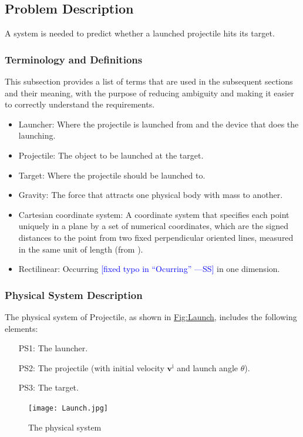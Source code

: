 \documentclass[12pt]{article}
\newcommand{\authornote}[3]{\textcolor{#1}{[#3 ---#2]}}
\newcommand{\authornote}[3]{}
\newcommand{\wss}[1]{\authornote{blue}{SS}{#1}}
\begin{document}
\subsection{Problem Description}
\label{Sec:ProbDesc}
A system is needed to predict whether a launched projectile hits its target.

\subsubsection{Terminology and Definitions}
\label{Sec:TermDefs}
This subsection provides a list of terms that are used in the subsequent sections and their meaning, with the purpose of reducing ambiguity and making it easier to correctly understand the requirements.

\begin{itemize}
\item{Launcher: Where the projectile is launched from and the device that does the launching.}
\item{Projectile: The object to be launched at the target.}
\item{Target: Where the projectile should be launched to.}
\item{Gravity: The force that attracts one physical body with mass to another.}
\item{Cartesian coordinate system: A coordinate system that specifies each point uniquely in a plane by a set of numerical coordinates, which are the signed distances to the point from two fixed perpendicular oriented lines, measured in the same unit of length (from \cite{cartesianWiki}).}
\item{Rectilinear: Occurring \wss{fixed typo in ``Ocurring''} in one dimension.}
\end{itemize}
\subsubsection{Physical System Description}
\label{Sec:PhysSyst}
The physical system of Projectile, as shown in \hyperref[Figure:Launch]{Fig:Launch}, includes the following elements:

\begin{itemize}
\item[PS1:]{The launcher.}
\item[PS2:]{The projectile (with initial velocity ${\symbf{v}^{\text{i}}}$ and launch angle $θ$).}
\item[PS3:]{The target.}
\end{itemize}
\begin{figure}
\begin{center}
\texttt{[image: Launch.jpg]}
\caption{The physical system}
\label{Figure:Launch}
\end{center}
\end{figure}
\end{document}
